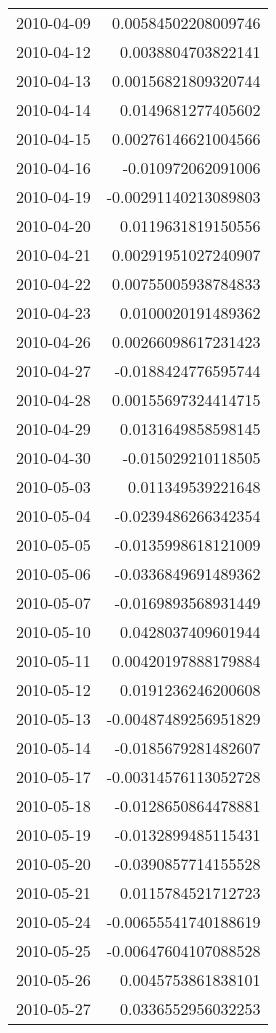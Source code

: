 \begin{tabular}{l | r}
2010-04-09 & 0.00584502208009746 \\
2010-04-12 & 0.0038804703822141 \\
2010-04-13 & 0.00156821809320744 \\
2010-04-14 & 0.0149681277405602 \\
2010-04-15 & 0.00276146621004566 \\
2010-04-16 & -0.010972062091006 \\
2010-04-19 & -0.00291140213089803 \\
2010-04-20 & 0.0119631819150556 \\
2010-04-21 & 0.00291951027240907 \\
2010-04-22 & 0.00755005938784833 \\
2010-04-23 & 0.0100020191489362 \\
2010-04-26 & 0.00266098617231423 \\
2010-04-27 & -0.0188424776595744 \\
2010-04-28 & 0.00155697324414715 \\
2010-04-29 & 0.0131649858598145 \\
2010-04-30 & -0.015029210118505 \\
2010-05-03 & 0.011349539221648 \\
2010-05-04 & -0.0239486266342354 \\
2010-05-05 & -0.0135998618121009 \\
2010-05-06 & -0.0336849691489362 \\
2010-05-07 & -0.0169893568931449 \\
2010-05-10 & 0.0428037409601944 \\
2010-05-11 & 0.00420197888179884 \\
2010-05-12 & 0.0191236246200608 \\
2010-05-13 & -0.00487489256951829 \\
2010-05-14 & -0.0185679281482607 \\
2010-05-17 & -0.00314576113052728 \\
2010-05-18 & -0.0128650864478881 \\
2010-05-19 & -0.0132899485115431 \\
2010-05-20 & -0.0390857714155528 \\
2010-05-21 & 0.0115784521712723 \\
2010-05-24 & -0.00655541740188619 \\
2010-05-25 & -0.00647604107088528 \\
2010-05-26 & 0.0045753861838101 \\
2010-05-27 & 0.0336552956032253 \\

\end{tabular}
